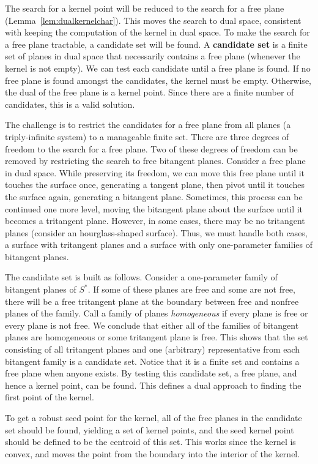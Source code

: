 \documentclass{elsart}
\begin{document}
The search for a kernel point will be reduced to the search for a free plane
(Lemma~\ref{lem:dualkernelchar}).
This moves the search to dual space, consistent with keeping the computation
of the kernel in dual space.
To make the search for a free plane tractable, a candidate set will be found.
A {\bf candidate set} is a finite set of planes in dual space
that necessarily contains a free plane (whenever the kernel is not empty).
We can test each candidate until a free plane is found.
If no free plane is found amongst the candidates,
the kernel must be empty.
Otherwise, the dual of the free plane is a kernel point.
Since there are a finite number of candidates, this is a valid solution.

The challenge is to restrict the candidates for a free plane from
all planes (a triply-infinite system) to a manageable finite set.
There are three degrees of freedom to the search for a free plane.
Two of these degrees of freedom can be removed by restricting the search
to free bitangent planes.
Consider a free plane in dual space.
While preserving its freedom, we can move this free plane
until it touches the surface once, generating a tangent plane,
then pivot until it touches the surface again, generating a bitangent plane.
Sometimes, this process can be continued one more level,
moving the bitangent plane about the surface until it becomes a
tritangent plane.
However, in some cases, there may be no tritangent planes
(consider an hourglass-shaped surface).
Thus, we must handle both cases, a surface with tritangent planes
and a surface with only one-parameter families of bitangent planes.

The candidate set is built as follows.
Consider a one-parameter family of bitangent planes of $S^*$.
If some of these planes are free and some are not free,
there will be a free tritangent plane at the boundary
between free and nonfree planes of the family.
Call a family of planes {\em homogeneous} if every plane is
free or every plane is not free.
We conclude that either all of the families of bitangent planes
are homogeneous or some tritangent plane is free.
This shows that the set consisting of all tritangent planes
and one (arbitrary) representative from each bitangent family
is a candidate set.
Notice that it is a finite set and contains a free plane when anyone exists.
By testing this candidate set, a free plane, and hence a kernel point, can be found.
This defines a dual approach to finding the first point of the kernel.

To get a robust seed point for the kernel,
all of the free planes in the candidate set should be found,
yielding a set of kernel points, and the seed kernel point 
should be defined to be the centroid of this set.
This works since the kernel is convex, and moves the point from the boundary
into the interior of the kernel.
\end{document}
